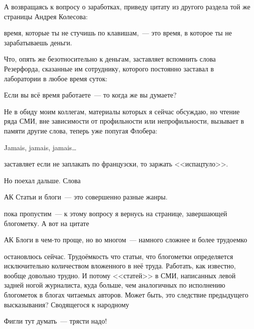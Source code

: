 А возвращаясь к вопросу о заработках, приведу цитату из другого раздела той же страницы Андрея Колесова:


\begin{shadequote}{}
время, которые ты не стучишь по клавишам,~--- это время, в которое ты не зарабатываешь деньги.
\end{shadequote}

Что, опять же безотносительно к деньгам, заставляет вспомнить слова Резерфорда, сказанные им сотруднику, которого постоянно заставал в лаборатории в любое время суток:


\begin{shadequote}{}
Если вы всё время работаете~--- то когда же вы думаете?
\end{shadequote}

Не в обиду моим коллегам, материалы которых я сейчас обсуждаю, но чтение ряда СМИ, вне зависимости от профильности или непрофильности, вызывает в памяти другие слова, теперь уже попугая Флобера:


\begin{shadequote}{}
Jamais, jamais, jamais\dots
\end{shadequote}

 заставляет если не заплакать по французски, то заржать <<испацтуло>>.

Но поехал дальше. Слова


\begin{shadequote}[r]{АК}
Статьи и блоги~--- это совершенно разные жанры.
\end{shadequote}

пока пропустим~--- к этому вопросу я вернусь на странице, завершающей блогометку. А вот на цитате


\begin{shadequote}[r]{АК}
Блоги в чем-то проще, но во многом~--- намного сложнее и более трудоемко
\end{shadequote}
остановлюсь сейчас. Трудоёмкость что статьи, что блогометки определяется исключительно количеством вложенного в неё труда. Работать, как известно, вообще довольно трудно. И потому <<статей>> в СМИ, написанных левой задней ногой журналиста, куда больше, чем аналогичных по исполнению блогометок в блогах читаемых авторов. Может быть, это следствие предыдущего высказывания? Сводящегося к народному


\begin{shadequote}{}
Фигли тут думать~--- трясти надо!
\end{shadequote}

